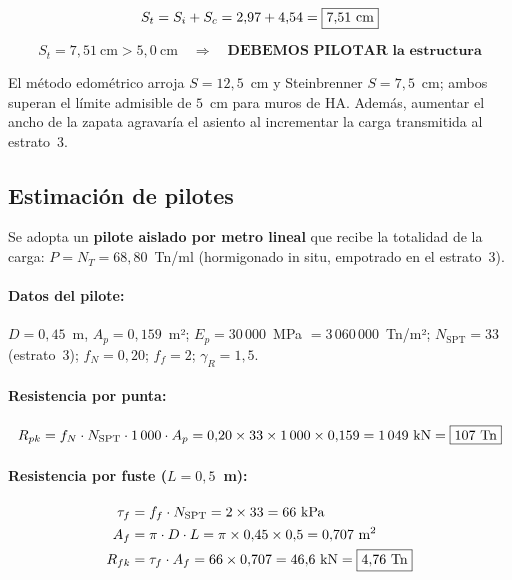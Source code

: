 \begin{equation}
  S_t = S_i + S_c = 2{,}97 + 4{,}54 = \boxed{7{,}51~\text{cm}}
  \label{eq:asiento_steinbrenner}
\end{equation}

\begin{resultadobox}
  \[
    S_t = 7{,}51~\text{cm} > 5{,}0~\text{cm}
    \quad\Longrightarrow\quad
    \textbf{DEBEMOS PILOTAR la estructura}
  \]
\end{resultadobox}

\begin{notabox}
  El método edométrico arroja $S = 12{,}5$~cm y Steinbrenner
  $S = 7{,}5$~cm; ambos superan el límite admisible de $5$~cm para
  muros de HA. Además, aumentar el ancho de la zapata agravaría el
  asiento al incrementar la carga transmitida al estrato~3.
\end{notabox}

\subsection{Estimación de pilotes}
\label{subsec:pilotes_muro}

Se adopta un \textbf{pilote aislado por metro lineal} que recibe la
totalidad de la carga: $P = N_T = 68{,}80$~Tn/ml (hormigonado in situ,
empotrado en el estrato~3).

\paragraph{Datos del pilote:}
$D = 0{,}45$~m, $A_p = 0{,}159$~m²;
$E_p = 30\,000$~MPa $= 3\,060\,000$~Tn/m²;
$N_\mathrm{SPT} = 33$ (estrato~3); $f_N = 0{,}20$; $f_f = 2$;
$\gamma_R = 1{,}5$.

\paragraph{Resistencia por punta:}
\begin{equation}
  R_{pk} = f_N\cdot N_\mathrm{SPT}\cdot 1\,000\cdot A_p
         = 0{,}20\times 33\times 1\,000\times 0{,}159
         = 1\,049~\text{kN} = \boxed{107~\text{Tn}}
\end{equation}

\paragraph{Resistencia por fuste ($L = 0{,}5$~m):}
\begin{align*}
  \tau_f &= f_f\cdot N_\mathrm{SPT} = 2\times 33 = 66~\text{kPa} \\
  A_f    &= \pi\cdot D\cdot L = \pi\times 0{,}45\times 0{,}5 = 0{,}707~\text{m}^2 \\
  R_{fk} &= \tau_f\cdot A_f = 66\times 0{,}707 = 46{,}6~\text{kN}
           = \boxed{4{,}76~\text{Tn}}
\end{align*}

